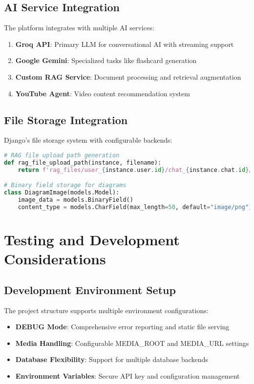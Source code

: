 \documentclass[12pt,a4paper]{article}
\begin{document}
\subsection{AI Service Integration}

The platform integrates with multiple AI services:

\begin{enumerate}
    \item \textbf{Groq API}: Primary LLM for conversational AI with streaming support
    \item \textbf{Google Gemini}: Specialized tasks like flashcard generation
    \item \textbf{Custom RAG Service}: Document processing and retrieval augmentation
    \item \textbf{YouTube Agent}: Video content recommendation system
\end{enumerate}

\subsection{File Storage Integration}

Django's file storage system with configurable backends:

\begin{lstlisting}[language=Python, caption=File Storage Configuration]
# RAG file upload path generation
def rag_file_upload_path(instance, filename):
    return f'rag_files/user_{instance.user.id}/chat_{instance.chat.id}/{filename}'

# Binary field storage for diagrams
class DiagramImage(models.Model):
    image_data = models.BinaryField()
    content_type = models.CharField(max_length=50, default="image/png")
\end{lstlisting}

\section{Testing and Development Considerations}

\subsection{Development Environment Setup}

The project structure supports multiple environment configurations:

\begin{itemize}
    \item \textbf{DEBUG Mode}: Comprehensive error reporting and static file serving
    \item \textbf{Media Handling}: Configurable MEDIA\_ROOT and MEDIA\_URL settings
    \item \textbf{Database Flexibility}: Support for multiple database backends
    \item \textbf{Environment Variables}: Secure API key and configuration management
\end{itemize}
\end{document}
